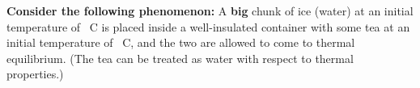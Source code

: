 

\noindent\textbf{Consider the following phenomenon:} A \textbf{big} chunk of ice (water) at an initial temperature of  \unit[65]{\textdegree C} is placed inside a well-insulated container with some tea at an initial temperature of \unit[20]{\textdegree C}, and the two are allowed to come to thermal equilibrium. (The tea can be treated as water with respect to thermal properties.)

